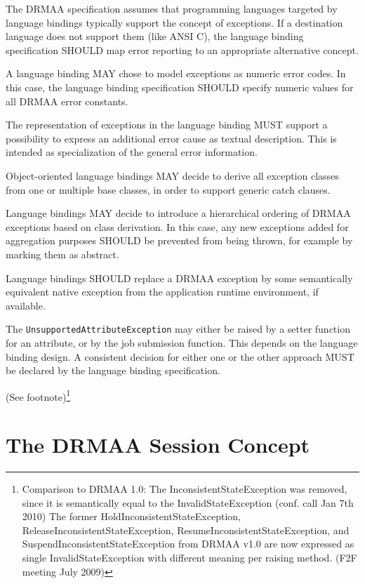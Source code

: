 \documentclass{article}
\newcommand{\h}[1]{\lstinline|#1|}
\newcommand{\langbind}[1]{\begin{shaded}#1\end{shaded}}
\newcommand{\rat}[1]{ {\tiny(See footnote)}\footnote{#1} }
\begin{document}
\langbind{
The DRMAA specification assumes that programming languages targeted by language bindings typically support the concept of exceptions. If a destination language does not support them (like ANSI C), the language binding specification SHOULD map error reporting to an appropriate alternative concept. 

A language binding MAY chose to model exceptions as numeric error codes. In this case, the language binding specification SHOULD specify numeric values for all DRMAA error constants. 

The representation of exceptions in the language binding MUST support a possibility to express an additional error cause as textual description. This is intended as specialization of the general error information. 

Object-oriented language bindings MAY decide to derive all exception classes from one or multiple base classes, in order to support generic catch clauses. 

Language bindings MAY decide to introduce a hierarchical ordering of DRMAA exceptions based on class derivation. In this case, any new exceptions added for aggregation purposes SHOULD be prevented from being thrown, for example by marking them as abstract. 

Language bindings SHOULD replace a DRMAA exception by some semantically equivalent native exception from the application runtime environment, if available.

The \h{UnsupportedAttributeException} may either be raised by a setter function for an attribute, or by the job submission function. This depends on the language binding design. A consistent decision for either one or the other approach MUST be declared by the language binding specification.
}

\rat{
Comparison to DRMAA 1.0: The InconsistentStateException was removed, since it is semantically equal to the InvalidStateException (conf. call Jan 7th 2010) The former HoldInconsistentStateException, ReleaseInconsistentStateException, ResumeInconsistentStateException, and SuspendInconsistentStateException from DRMAA v1.0 are now expressed as single InvalidStateException with different meaning per raising method. (F2F meeting July 2009)
}

\section{The DRMAA Session Concept}
\label{sec:sessionconcept}
\end{document}
